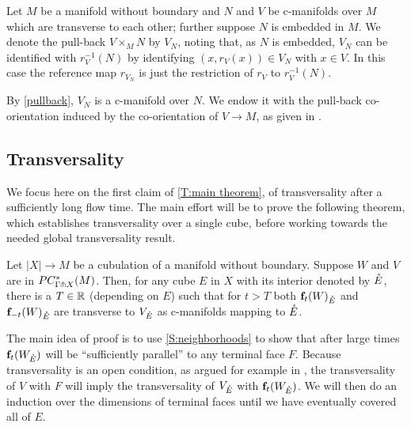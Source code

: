 \begin{definition}
	Let $M$ be a manifold without boundary and $N$ and $V$ be c-manifolds over $M$ which are transverse to each other; further suppose $N$ is embedded in $M$.
	We denote the pull-back $V \times_M N$ by $V_N$, noting that, as $N$ is embedded, $V_N$ can be identified with $r_V^{-1}(N)$ by identifying $(x, r_V(x)) \in V_N$ with $x \in V$.
	In this case the reference map $r_{V_N}$ is just the restriction of $r_V$ to $r_V^{-1}(N)$.

	By \cref{pullback}, $V_N$ is a c-manifold over $N$.
	We endow it with the pull-back co-orientation induced by the co-orientation of $V\to M$, as given in \cite[Sections 3.5.1 and 3.5.2]{medina2022foundations}.
\end{definition}

\subsection{Transversality}

We focus here on the first claim of \cref{T:main theorem}, of transversality after a sufficiently long flow time.
The main effort will be to prove the following theorem, which establishes transversality over
a single cube, before working towards the needed global transversality result.



\begin{theorem}\label{T:transversality}
	Let $|X| \to M$ be a cubulation of a manifold without boundary.
	Suppose $W$ and $V$ are in $PC_{\Gamma \pitchfork X}^*(M)$.
	Then, for any cube $E$ in $X$ with its interior denoted by $\mathring{E}$, there is a $T \in \mathbb{R}$ (depending on $E$) such that for $t > T$ both $\mathbf{f}_t(W)_{\mathring{E}}$ and $\mathbf{f}_{-t}(W)_{\mathring{E}}$ are transverse to $V_{\mathring{E}}$ as c-manifolds mapping to $\mathring{E}$.
\end{theorem}


The main idea of proof is to use \cref{S:neighborhoods} to show that after large times $\mathbf{f}_t(W_{\mathring{E}})$ will be
``sufficiently parallel'' to any terminal face $F$.
Because transversality is an open condition, as argued for example in \cite[Section 1.6]{GuPo74}, the transversality of $V$ with $F$ will imply the transversality of $V_{\mathring{E}}$ with $\mathbf{f}_t(W_{\mathring{E}})$.
We will then do an induction over the dimensions of terminal faces until we have eventually covered all of $E$.

